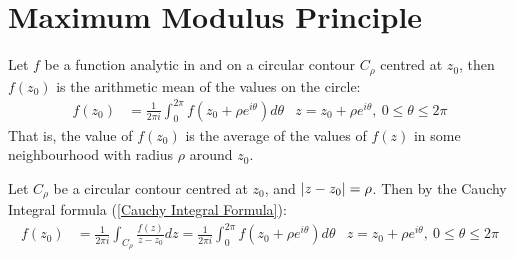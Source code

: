\documentclass[12pt, english]{book}
\makeatletter
\renewenvironment{proof}[1][\proofname]{\par
	\pushQED{\qed}%
	\normalfont \topsep6\p@\@plus6\p@\relax
	\list{}{%
		\settowidth{\leftmargin}{\itshape\proofname:\hskip\labelsep}%
		\setlength{\labelwidth}{0pt}%
		\setlength{\itemindent}{-\leftmargin}%
	}%
	\item[\hskip\labelsep\itshape#1\@addpunct{:}]\ignorespaces
}{%
	\popQED\endlist\@endpefalse
}
\makeatother
\begin{document}
	\section{Maximum Modulus Principle} \label{Maximum Modulus Principle Section - Complex}
	
	\begin{theorem}
		\label{Gauss's Mean Value Theorem - Complex}
		Let \(f\) be a function analytic in and on a circular contour \(C_\rho\) centred at \(z_0\), then \(f(z_0)\) is the arithmetic mean of the values on the circle:
		\begin{align*}
			f(z_0) &= \frac{1}{2\pi i} \int_{0}^{2\pi} f(z_0 + \rho e^{i\theta}) d\theta 
			& z=z_0 + \rho e^{i\theta}, \ 0\leq \theta \leq 2\pi
		\end{align*}
		That is, the value of \(f(z_0)\) is the average of the values of \(f(z)\) in some neighbourhood with radius \(\rho\) around \(z_0\).
	\end{theorem}
	\begin{proof}
		Let \(C_\rho\) be a circular contour centred at \(z_0\), and \(\abs{z-z_0} = \rho\). Then by the Cauchy Integral formula (\cref{Cauchy Integral Formula}):
		\begin{align*}
			f(z_0) &= \frac{1}{2\pi i} \int_{C_\rho} \frac{f(z)}{z-z_0} dz = \frac{1}{2\pi i} \int_{0}^{2\pi} f(z_0 + \rho e^{i\theta}) d\theta 
			& z=z_0 + \rho e^{i\theta}, \ 0\leq \theta \leq 2\pi
		\end{align*}
	\end{proof}
	
\end{document}
